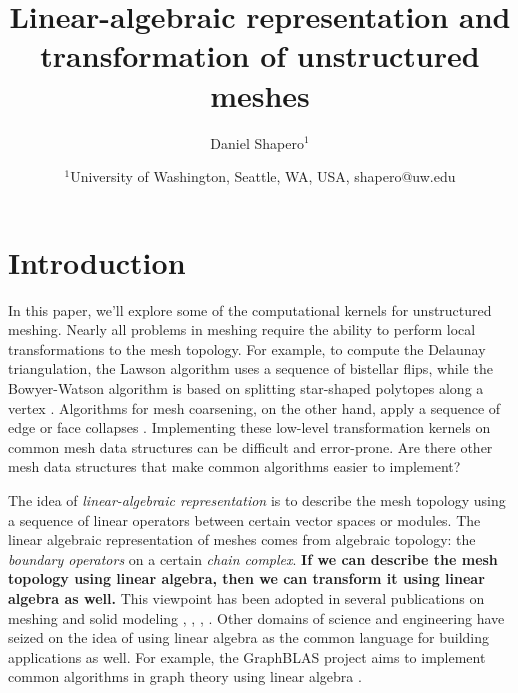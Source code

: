 \documentclass[twocolumn]{article}
\begin{document}
\title{Linear-algebraic representation and transformation of unstructured meshes}
\author{Daniel Shapero$^1$}
\date{
    $^1$University of Washington, Seattle, WA, USA, shapero@uw.edu
}



\maketitle
\thispagestyle{empty}
\pagestyle{empty}


\section{Introduction}

In this paper, we'll explore some of the computational kernels for unstructured meshing.
Nearly all problems in meshing require the ability to perform local transformations to the mesh topology.
For example, to compute the Delaunay triangulation, the Lawson algorithm uses a sequence of bistellar flips, while the Bowyer-Watson algorithm is based on splitting star-shaped polytopes along a vertex \cite{cheng2013delaunay}.
Algorithms for mesh coarsening, on the other hand, apply a sequence of edge or face collapses \cite{cignoni1998comparison}.
Implementing these low-level transformation kernels on common mesh data structures can be difficult and error-prone.
Are there other mesh data structures that make common algorithms easier to implement?

The idea of \emph{linear-algebraic representation} is to describe the mesh topology using a sequence of linear operators between certain vector spaces or modules.
The linear algebraic representation of meshes comes from algebraic topology: the \emph{boundary operators} on a certain \emph{chain complex}.
\textbf{If we can describe the mesh topology using linear algebra, then we can transform it using linear algebra as well.}
This viewpoint has been adopted in several publications on meshing and solid modeling \cite{dicarlo2007solid}, \cite{dicarlo2014linear}, \cite{mueller2017ternary}, \cite{paoluzzi2020topological}.
Other domains of science and engineering have seized on the idea of using linear algebra as the common language for building applications as well.
For example, the GraphBLAS project aims to implement common algorithms in graph theory using linear algebra \cite{mattson2013standards}.
\end{document}
